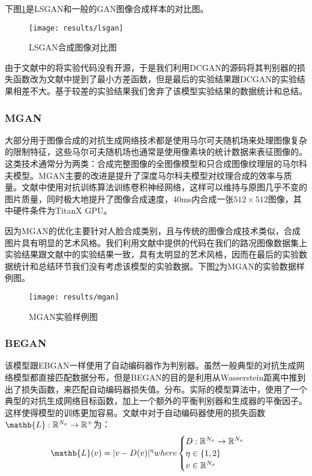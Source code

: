 下图\ref{fig:lsgan}是LSGAN和一般的GAN图像合成样本的对比图。

\begin{figure}[h]
    \centering
    \texttt{[image: results/lsgan]}
    \caption{LSGAN合成图像对比图}
    \label{fig:lsgan}
\end{figure}

由于文献中的将实验代码没有开源，于是我们利用DCGAN的源码将其判别器的损失函数改为文献中提到了最小方差函数，但是最后的实验结果跟DCGAN的实验结果相差不大。基于较差的实验结果我们舍弃了该模型实验结果的数据统计和总结。

\subsubsection{MGAN}

 大部分用于图像合成的对抗生成网络技术都是使用马尔可夫随机场来处理图像复杂的限制特征，这些马尔可夫随机场也通常是使用像素块的统计数据来表征图像的。这类技术通常分为两类：合成完整图像的全图像模型和只合成图像纹理层的马尔科夫模型。MGAN主要的改进是提升了深度马尔科夫模型对纹理合成的效率与质量。文献\cite{MGAN}中使用对抗训练\cite{adtrain}算法训练卷积神经网络，这样可以维持与原图几乎不变的图片质量，同时极大地提升了图像合成速度，40ms内合成一张$512\times 512$图像，其中硬件条件为TitanX GPU。

因为MGAN的优化主要针对人脸合成类别，且与传统的图像合成技术类似，合成图片具有明显的艺术风格。我们利用文献中提供的代码\cite{git:mgan}在我们的路况图像数据集上实验结果跟文献中的实验结果一致，具有太明显的艺术风格，因而在最后的实验数据统计和总结环节我们没有考虑该模型的实验数据。下图\ref{fig:mag}为MGAN的实验数据样例图。

\begin{figure}[h] 
    \centering
    \texttt{[image: results/mgan]}
    \caption{MGAN实验样例图}
    \label{fig:mag}
\end{figure}

\subsubsection{BEGAN}

  该模型跟EBGAN\cite{ebgan}一样使用了自动编码器作为判别器。虽然一般典型的对抗生成网络模型都直接匹配数据分布，但是BEGAN的目的是利用从Wasserstein距离中推到出了损失函数，来匹配自动编码器损失值。分布。实际的模型算法中，使用了一个典型的对抗生成网络目标函数，加上一个额外的平衡判别器和生成器的平衡因子。这样使得模型的训练更加容易。文献\cite{BEGAN}中对于自动编码器使用的损失函数$\mathb{L}:\mathbb{R}^{N_x}\to \mathbb{R}^+$为：
$$
\mathb{L}(v) = |v-D(v)|^\eta where \begin{cases}
    D: \mathbb{R}^{N_x}\to \mathbb{R}^{N_x} \quad  \\
    \eta \in \{1,2\} \quad  \\
    v \in \mathbb{R}^{N_x} 
\end{cases}
$$

